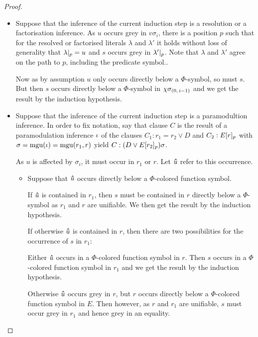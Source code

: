 \documentclass[,%
	draft=false,%
	numbers=noendperiod
	12pt,
	a4paper,
	oneside,%
	openany,
]{memoir}
\newcommand{\inv}{\ensuremath{\chi}}
\begin{document}
\begin{proof}
\begin{itemize}
\begin{itemize}
					\begin{itemize}
						\item
							Suppose that the inference of the current induction step is a resolution or a factorisation inference.
							As $u$ occurs grey in $v\sigma_i$, there is a position $p$ such that for the resolved or factorised literals $\lambda$ and $\lambda'$ it holds without loss of generality that $\lambda|_{p} = u$ and $s$ occurs grey in $\lambda'|_{p}$.
							Note that $\lambda$ and $\lambda'$ agree on the path to $p$, including the predicate symbol..

							Now as by assumption $u$ only occurs directly below a $\Phi$-symbol, so must $s$.
							But then $s$ occurs directly below a $\Phi$-symbol in $\inv\sigmazmi$ and we get the result by the induction hypothesis.

						\item
							Suppose that the inference of the current induction step is a paramodultion inference.
							In order to fix notation, say that clause $C$ is the result of a paramodulation inference\nolinebreak{} $\iota$ of the clauses $C_1: r_1=r_2 \lor D$ and $C_2: E{[r]_{p}}$ with $\sigma=\operatorname{mgu}(\iota)=\operatorname{mgu}(r_1, r)$ yield $C: (D\lor E{[r_2]_{p}})\sigma$.

							As $u$ is affected by $\sigma_i$, it must occur in $r_1$ or $r$. Let $\bm\hat u$ refer to this occurrence.

							\cbstart
							\begin{itemize}
								\item
									Suppose that $\bm\hat u$ occurs directly below a $\Phi$-colored function symbol. 

									If $\bm\hat u$ is contained in $r_1$, then $s$ must be contained in $r$ directly below a $\Phi$-symbol as $r_1$ and $r$ are unifiable. We then get the result by the induction hypothesis.

									If otherwise $\bm\hat u$ is contained in $r$, 
									then there are two possibilities for the occurrence of $s$ in $r_1$:

									Either $\bm\hat u$ occurs in a $\Phi$-colored function symbol in $r$. Then $s$ occurs in a $\Phi$-colored function symbol in $r_1$ and we get the result by the induction hypothesis.

									Otherwise $\bm\hat u$ occurs grey in $r$, but $r$ occurs directly below a $\Phi$-colored function symbol in $E$.
									Then however, as $r$ and $r_1$ are unifiable, $s$ must occur grey in $r_1$ and hence grey in an equality.


\end{itemize}
\end{itemize}
\end{itemize}
\end{itemize}
\end{proof}
\end{document}
